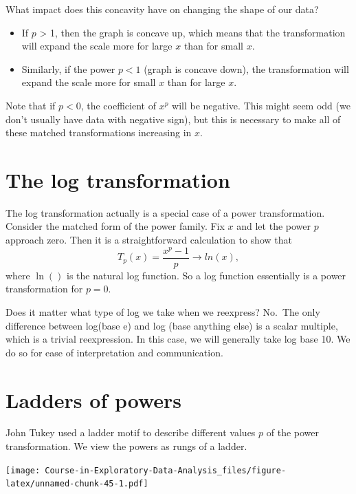 \documentclass[
]{book}
\begin{document}
What impact does this concavity have on changing the shape of our data?

\begin{itemize}
\item
  If \(p\) \textgreater{} 1, then the graph is concave up, which means that the transformation will expand the scale more for large \(x\) than for small \(x\).
\item
  Similarly, if the power \(p < 1\) (graph is concave down), the transformation will expand the scale more for small \(x\) than for large \(x\).
\end{itemize}

Note that if \(p < 0\), the coefficient of \(x^p\) will be negative. This might seem odd (we don't usually have data with negative sign), but this is necessary to make all of these matched transformations increasing in \(x\).

\hypertarget{the-log-transformation}{%
\section{The log transformation}\label{the-log-transformation}}

The log transformation actually is a special case of a power transformation. Consider the matched form of the power family. Fix \(x\) and let the power \(p\) approach zero. Then it is a straightforward calculation to show that
\[
T_p(x) = \frac{x^p - 1}{p} \rightarrow ln(x),
\]
where \(\ln()\) is the natural log function. So a log function essentially is a power transformation for \(p = 0\).

Does it matter what type of log we take when we reexpress? No.~The only difference between log(base e) and log (base anything else) is a scalar multiple, which is a trivial reexpression. In this case, we will generally take log base 10. We do so for ease of interpretation and communication.

\hypertarget{ladders-of-powers}{%
\section{Ladders of powers}\label{ladders-of-powers}}

John Tukey used a ladder motif to describe different values \(p\) of the power transformation. We view the powers as rungs of a ladder.

\texttt{[image: Course-in-Exploratory-Data-Analysis\_files/figure-latex/unnamed-chunk-45-1.pdf]}
\end{document}

